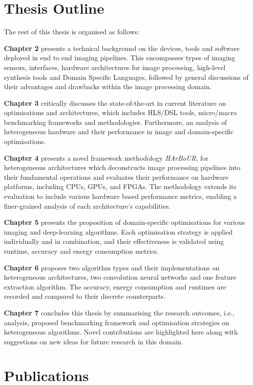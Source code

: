 \section{Thesis Outline}
The rest of this thesis is organised as follows:

\textbf{Chapter 2} presents a technical background on the devices, tools and software deployed in end to end imaging pipelines. This encompasses types of imaging sensors, interfaces, hardware architectures for image processing, high-level synthesis tools and Domain Specific Languages, followed by general discussions of their advantages and drawbacks within the image processing domain.\par

\textbf{Chapter 3} critically discusses the state-of-the-art in current literature on optimisations and architectures, which includes HLS/DSL tools, micro/macro benchmarking frameworks and methodologies. Furthermore, an analysis of heterogeneous hardware and their performance in image and domain-specific optimisations.   

\textbf{Chapter 4} presents a novel framework methodology \textit{HArBoUR}, for heterogeneous architectures which deconstructs image processing pipelines into their fundamental operations and evaluates their performance on hardware platforms, including CPUs, GPUs, and FPGAs. The methodology extends its evaluation to include various hardware based performance metrics, enabling a finer-grained analysis of each architecture's capabilities.

\textbf{Chapter 5} presents the proposition of domain-specific optimisations for various imaging and deep-learning algorithms. Each optimisation strategy is applied individually and in combination, and their effectiveness is validated using runtime, accuracy and energy consumption metrics.

\textbf{Chapter 6} proposes two algorithm types and their implementations on heterogeneous architectures, two convolution neural networks and one feature extraction algorithm. The accuracy, energy consumption and runtimes are recorded and compared to their discrete counterparts.

\textbf{Chapter 7} concludes this thesis by summarising the research outcomes, i.e., analysis, proposed benchmarking framework and optimisation strategies on heterogeneous algorithms. Novel contributions are highlighted here along with suggestions on new ideas for future research in this domain.

\section{Publications}

